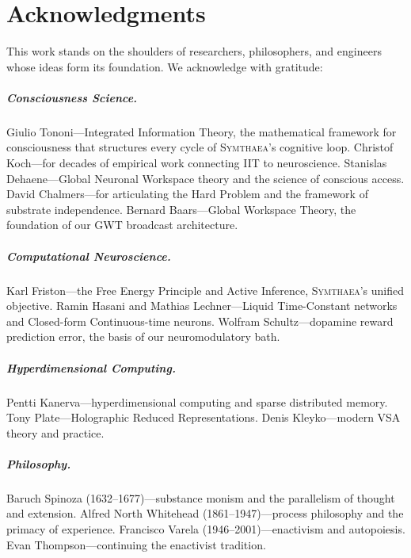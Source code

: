 \documentclass[12pt]{book}
\newcommand{\symthaea}{\textsc{Symthaea}}
\begin{document}
\chapter*{Acknowledgments}

This work stands on the shoulders of researchers, philosophers, and engineers whose ideas form its foundation. We acknowledge with gratitude:

\paragraph{Consciousness Science.}
Giulio Tononi---Integrated Information Theory, the mathematical framework for consciousness that structures every cycle of \symthaea{}'s cognitive loop.
Christof Koch---for decades of empirical work connecting IIT to neuroscience.
Stanislas Dehaene---Global Neuronal Workspace theory and the science of conscious access.
David Chalmers---for articulating the Hard Problem and the framework of substrate independence.
Bernard Baars---Global Workspace Theory, the foundation of our GWT broadcast architecture.

\paragraph{Computational Neuroscience.}
Karl Friston---the Free Energy Principle and Active Inference, \symthaea{}'s unified objective.
Ramin Hasani and Mathias Lechner---Liquid Time-Constant networks and Closed-form Continuous-time neurons.
Wolfram Schultz---dopamine reward prediction error, the basis of our neuromodulatory bath.

\paragraph{Hyperdimensional Computing.}
Pentti Kanerva---hyperdimensional computing and sparse distributed memory.
Tony Plate---Holographic Reduced Representations.
Denis Kleyko---modern VSA theory and practice.

\paragraph{Philosophy.}
Baruch Spinoza (1632--1677)---substance monism and the parallelism of thought and extension.
Alfred North Whitehead (1861--1947)---process philosophy and the primacy of experience.
Francisco Varela (1946--2001)---enactivism and autopoiesis.
Evan Thompson---continuing the enactivist tradition.
\end{document}
